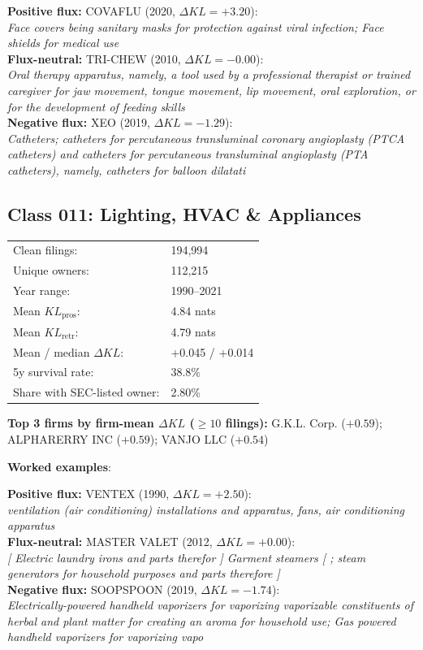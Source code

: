   \textbf{Positive flux:} \textsc{COVAFLU} (2020, $\Delta KL=+3.20$):\\
  \textit{Face covers being sanitary masks for protection against viral infection; Face shields for medical use}\\
  \textbf{Flux-neutral:} \textsc{TRI-CHEW} (2010, $\Delta KL=-0.00$):\\
  \textit{Oral therapy apparatus, namely, a tool used by a professional therapist or trained caregiver for jaw movement, tongue movement, lip movement, oral exploration, or for the development of feeding skills}\\
  \textbf{Negative flux:} \textsc{XEO} (2019, $\Delta KL=-1.29$):\\
  \textit{Catheters; catheters for percutaneous transluminal coronary angioplasty (PTCA catheters) and catheters for percutaneous transluminal angioplasty (PTA catheters), namely, catheters for balloon dilatati}\\

\subsection*{Class 011: Lighting, HVAC \& Appliances}
\label{app:industry-011}

\begin{tabular}{ll}
Clean filings: & 194,994 \\
Unique owners: & 112,215 \\
Year range: & 1990--2021 \\
Mean $KL_\text{pros}$: & 4.84 nats \\
Mean $KL_\text{retr}$: & 4.79 nats \\
Mean / median $\Delta KL$: & +0.045 / +0.014 \\
5y survival rate: & 38.8\% \\
Share with SEC-listed owner: & 2.80\% \\
\end{tabular}

\textbf{Top 3 firms by firm-mean $\Delta KL$ ($\geq 10$ filings):} G.K.L. Corp. ($+0.59$); ALPHARERRY INC ($+0.59$); VANJO LLC ($+0.54$)

\textbf{Worked examples}:

  \textbf{Positive flux:} \textsc{VENTEX} (1990, $\Delta KL=+2.50$):\\
  \textit{ventilation (air conditioning) installations and apparatus, fans, air conditioning apparatus}\\
  \textbf{Flux-neutral:} \textsc{MASTER VALET} (2012, $\Delta KL=+0.00$):\\
  \textit{[ Electric laundry irons and parts therefor ] Garment steamers [ ; steam generators for household purposes and parts therefore ]}\\
  \textbf{Negative flux:} \textsc{SOOPSPOON} (2019, $\Delta KL=-1.74$):\\
  \textit{Electrically-powered handheld vaporizers for vaporizing vaporizable constituents of herbal and plant matter for creating an aroma for household use; Gas powered handheld vaporizers for vaporizing vapo}\\

